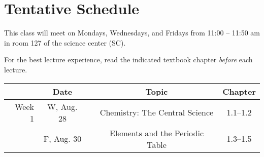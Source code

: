 \documentclass[12pt, letterpaper]{article}
\begin{document}
\section*{Tentative Schedule}
This class will meet on Mondays, Wednesdays, and Fridays from 11:00  -- 11:50 am in room 127 of the science center (SC).


\noindent For the best lecture experience, read the indicated textbook chapter \emph{before} each lecture.

\noindent
\begin{tabular}{rcccc}
& Date && Topic & Chapter\\
\midrule
Week 1 & W, Aug. 28&& Chemistry: The Central Science & 1.1--1.2\\
& F, Aug. 30&& Elements and the Periodic Table & 1.3--1.5\\
\end{tabular}
\end{document}
